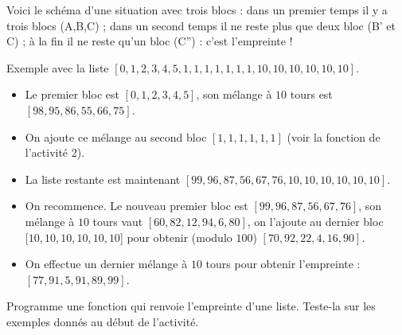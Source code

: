 \documentclass[11pt,class=report,crop=false]{standalone}
\begin{document}
\begin{activite}
\begin{enumerate}
 
Voici le schéma d'une situation avec trois blocs : dans un premier temps il y a trois blocs (A,B,C) ; dans un second temps il ne reste plus que deux bloc (B' et C) ; à la fin il ne reste qu'un bloc (C'') : c'est l'empreinte !
  
  
  Exemple avec la liste $[0,1,2,3,4,5,1,1,1,1,1,1,1,10,10,10,10,10,10]$.
  \begin{itemize}
    \item Le premier bloc est $[0,1,2,3,4,5]$, son mélange à $10$ tours est 
    $[98, 95, 86, 55, 66, 75]$. 
    \item On ajoute ce mélange au second bloc $[1,1,1,1,1,1]$ (voir la fonction  de l'activité 2).
    \item La liste restante est maintenant $[99,96,87,56,67,76,10,10,10,10,10,10]$.
    \item On recommence. Le nouveau premier bloc est $[99,96,87,56,67,76]$, son mélange à $10$ tours vaut $[60, 82, 12, 94, 6, 80]$, on l'ajoute au dernier bloc $[10,10,10,10,10,10$] pour obtenir (modulo $100$) $[70,92,22,4,16,90]$.
    \item On effectue un dernier mélange à $10$ tours pour obtenir l'empreinte : $[77, 91, 5, 91, 89, 99]$.
   \end{itemize}
   
   Programme une fonction  qui renvoie l'empreinte d'une liste.
     Teste-la sur les exemples donnés au début de l'activité.
\end{enumerate}   
     
\end{activite}



\end{document}

